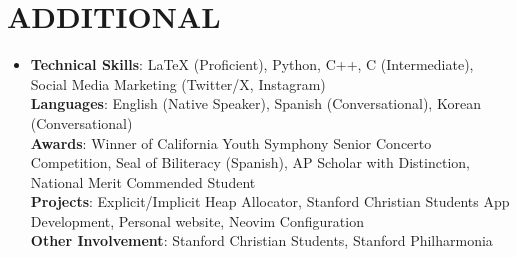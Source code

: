 \documentclass[letterpaper,11pt]{article}
\begin{document}
    \section{\textbf{ADDITIONAL}}
 \begin{itemize}[leftmargin=0in, label={}]
    \item{
        \textbf{Technical Skills}{: \small{LaTeX (Proficient), Python, C++, C (Intermediate), Social Media Marketing (Twitter/X, Instagram)}} \\
        \textbf{Languages}{: \small{English (Native Speaker), Spanish (Conversational), Korean (Conversational)}} \\
        \textbf{Awards}{: \small{Winner of California Youth Symphony Senior Concerto Competition, Seal of Biliteracy (Spanish), AP Scholar with Distinction, National Merit Commended Student}} \\
        \textbf{Projects}{: \small{Explicit/Implicit Heap Allocator, Stanford Christian Students App Development, Personal website, Neovim Configuration}} \\
        \textbf{Other Involvement}{: \small{Stanford Christian Students, Stanford Philharmonia}} \\
    }
 \end{itemize}
\end{document}
